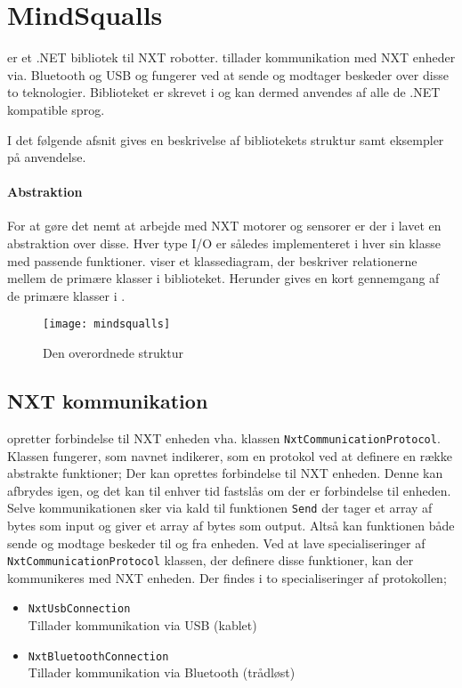 \section{MindSqualls}\label{mindsqualls}
\mindsqualls er et .NET bibliotek til \legos NXT robotter.
\mindsqualls tillader kommunikation med NXT enheder via. Bluetooth og USB og fungerer ved at sende og modtager beskeder over disse to teknologier.
Biblioteket er skrevet i \csharp og kan dermed anvendes af alle de .NET kompatible sprog.

I det følgende afsnit gives en beskrivelse af bibliotekets struktur samt eksempler på anvendelse.

\paragraph{Abstraktion}
For at gøre det nemt at arbejde med NXT motorer og sensorer er der i \mindsqualls lavet en abstraktion over disse.
Hver type I/O er således implementeret i hver sin klasse med passende funktioner.
 viser et klassediagram, der beskriver relationerne mellem de primære klasser i \mindsqualls biblioteket.
Herunder gives en kort gennemgang af de primære klasser i \mindsqualls.

\begin{figure}
\centering
\texttt{[image: mindsqualls]}
\caption{Den overordnede \mindsqualls struktur}
\label{mindsqualls:structure}
\end{figure}

\subsection{NXT kommunikation}
\mindsqualls opretter forbindelse til NXT enheden vha. klassen \lstinline[style=csharp]!NxtCommunicationProtocol!.
Klassen fungerer, som navnet indikerer, som en protokol ved at definere en række abstrakte funktioner;
Der kan oprettes forbindelse til NXT enheden.
Denne kan afbrydes igen, og det kan til enhver tid fastslås om der er forbindelse til enheden.
Selve kommunikationen sker via kald til funktionen \lstinline[style=csharp]!Send! der tager et array af bytes som input og giver et array af bytes som output.
Altså kan funktionen både sende og modtage beskeder til og fra enheden.
Ved at lave specialiseringer af \lstinline[style=csharp]!NxtCommunicationProtocol! klassen, der definere disse funktioner, kan der kommunikeres med NXT enheden.
Der findes i \mindsqualls to specialiseringer af protokollen;
\begin{itemize}
\item \lstinline[style=csharp]!NxtUsbConnection!\\
Tillader kommunikation via USB (kablet)
\item \lstinline[style=csharp]!NxtBluetoothConnection!\\
Tillader kommunikation via Bluetooth (trådløst)
\end{itemize}

